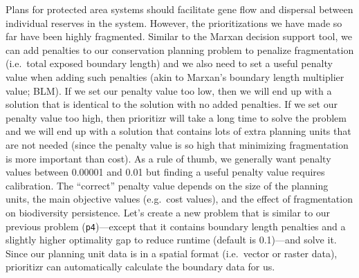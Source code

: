 \documentclass[12pt,]{book}
\newenvironment{Shaded}{\begin{snugshade}}{\end{snugshade}}
\newcommand{\CommentTok}[1]{\textcolor[rgb]{0.56,0.35,0.01}{\textit{#1}}}
\newcommand{\DataTypeTok}[1]{\textcolor[rgb]{0.13,0.29,0.53}{#1}}
\newcommand{\DecValTok}[1]{\textcolor[rgb]{0.00,0.00,0.81}{#1}}
\newcommand{\FloatTok}[1]{\textcolor[rgb]{0.00,0.00,0.81}{#1}}
\newcommand{\KeywordTok}[1]{\textcolor[rgb]{0.13,0.29,0.53}{\textbf{#1}}}
\newcommand{\NormalTok}[1]{#1}
\newcommand{\OperatorTok}[1]{\textcolor[rgb]{0.81,0.36,0.00}{\textbf{#1}}}
\newcommand{\OtherTok}[1]{\textcolor[rgb]{0.56,0.35,0.01}{#1}}
\newcommand{\StringTok}[1]{\textcolor[rgb]{0.31,0.60,0.02}{#1}}
\begin{document}
Plans for protected area systems should facilitate gene flow and dispersal between individual reserves in the system. However, the prioritizations we have made so far have been highly fragmented. Similar to the Marxan decision support tool, we can add penalties to our conservation planning problem to penalize fragmentation (i.e.~total exposed boundary length) and we also need to set a useful penalty value when adding such penalties (akin to Marxan's boundary length multiplier value; BLM). If we set our penalty value too low, then we will end up with a solution that is identical to the solution with no added penalties. If we set our penalty value too high, then prioritizr will take a long time to solve the problem and we will end up with a solution that contains lots of extra planning units that are not needed (since the penalty value is so high that minimizing fragmentation is more important than cost). As a rule of thumb, we generally want penalty values between 0.00001 and 0.01 but finding a useful penalty value requires calibration. The ``correct'' penalty value depends on the size of the planning units, the main objective values (e.g.~cost values), and the effect of fragmentation on biodiversity persistence. Let's create a new problem that is similar to our previous problem (\texttt{p4})---except that it contains boundary length penalties and a slightly higher optimality gap to reduce runtime (default is 0.1)---and solve it. Since our planning unit data is in a spatial format (i.e.~vector or raster data), prioritizr can automatically calculate the boundary data for us.

\clearpage

\begin{Shaded}
\end{Shaded}
\end{document}
